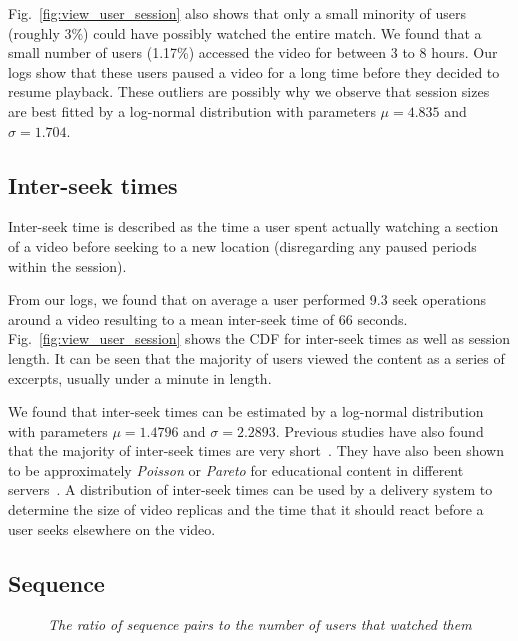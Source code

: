 \documentclass[letterpaper,nocopyrightspace]{sig-alternate}
\newcommand{\capttext}{\protect\centering\em}
\begin{document}
Fig.~\ref{fig:view_user_session} also shows that only a small
minority of users (roughly 3\%) could have possibly watched the
entire match. We found that a small number of users (1.17\%)
accessed the video for between 3 to 8 hours. Our logs show that
these users paused a video for a long time before they decided to
resume playback. These outliers are possibly why we observe that
session sizes are best fitted by a log-normal distribution with
parameters $\mu=4.835$ and $\sigma=1.704$.

\subsection{Inter-seek times}

Inter-seek time is described as the time a user spent actually
watching a section of a video before seeking to a new location
(disregarding any paused periods within the session).

From our logs, we found that on average a user performed 9.3 seek
operations around a video resulting to a mean inter-seek time of 66
seconds. Fig.~\ref{fig:view_user_session} shows the CDF for
inter-seek times as well as session length. It can be seen that the
majority of users viewed the content as a series of excerpts,
usually under a minute in length.


We found that inter-seek times can be estimated by a log-normal
distribution with parameters $\mu=1.4796$ and $\sigma=2.2893$.
Previous studies have also found that the majority of inter-seek
times are very short~\cite{vilas2005user}. They have also been shown
to be approximately {\em Poisson} or {\em Pareto} for educational
content in different servers~\cite{Almeida01Analysis}. A
distribution of inter-seek times can be used by a delivery system to
determine the size of video replicas and the time that it should
react before a user seeks elsewhere on the video.

\subsection{Sequence}
\begin{figure}[tb]
\centering {} \caption{\capttext The ratio of sequence pairs
to the number of users that watched them} \label{fig:all_sequence}
\end{figure}
\end{document}
